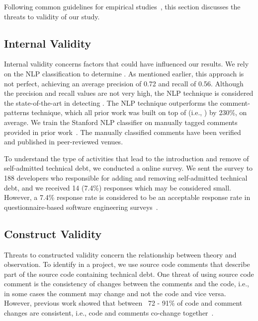 Following common guidelines for empirical studies~\cite{yin2013case},  this section discusses the threats to validity of our study.

\subsection{Internal Validity} Internal validity concerns factors that could
have influenced our results. We rely on the NLP classification to determine \SATD. As mentioned earlier, this approach is not perfect, achieving an average precision of 0.72 and recall of 0.56. Although the precision and recall values are not very high, the NLP technique is considered the state-of-the-art in detecting \SATD. The NLP technique outperforms the comment-patterns technique, which all prior work was built on top of (i.e., \cite{Wehaibi2016SANER,Bavota2016MSR,Potdar2014ICSME}) by 230\%, on average. We train the Stanford NLP classifier on manually tagged \SATD comments provided in prior work~\cite{Maldonado2015TSE}. The manually classified comments have been verified and published in peer-reviewed venues. 


To understand the type of activities that lead to the introduction and remove of self-admitted technical debt, we conducted a online survey. We sent the survey to 188 developers who responsible for adding and removing self-admitted technical debt, and we received 14 (7.4\%) responses which may be considered small. However, a 7.4\% response rate is considered to be an acceptable response rate in questionnaire-based software engineering surveys~\cite{singer2008software}.

\subsection{Construct Validity} Threats to constructed validity concern the relationship between theory and observation.
To identify \SATD in a project, we use source code comments that describe part of the source code containing technical debt. One threat of using source code comment is the consistency of changes between the comments and the code, i.e., in some cases the comment may change and not the code and vice versa. However, previous work showed that between ~72 - 91\% of code and comment changes are consistent, i.e., code and comments co-change together~\cite{Potdar2014ICSME}.

